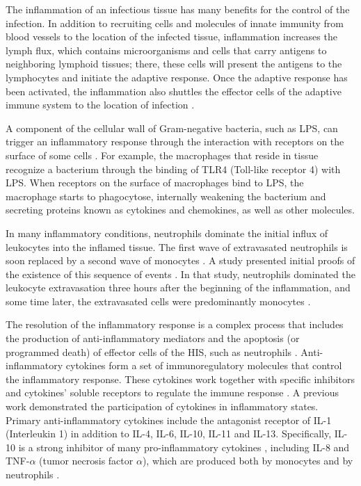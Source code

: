 \documentclass[10pt]{bmc_article}
\newenvironment{bmcformat}{\baselineskip20pt\sloppy\setboolean{publ}{false}}{\baselineskip20pt\sloppy}
\begin{document}
\begin{bmcformat}
The inflammation of an infectious tissue has many benefits for the control of the infection. In addition to recruiting cells and 
molecules of innate immunity from blood vessels to the location of the infected tissue, inflammation increases the lymph flux, 
which contains microorganisms and cells that carry antigens to neighboring lymphoid tissues; there, these cells will present the 
antigens to the lymphocytes and initiate the adaptive response. Once the adaptive response has been activated, the inflammation 
also shuttles the effector cells of the adaptive immune system to the location of infection \cite{janeway}.

A component of the cellular wall of Gram-negative bacteria, such as LPS, can trigger an inflammatory response through the interaction 
with receptors on the surface of some cells \cite{Sompayrac2008}. For example, the macrophages that reside in tissue recognize a bacterium through the 
binding of TLR4 (Toll-like receptor 4) with LPS. When receptors on the surface of macrophages bind to LPS, the macrophage starts 
to phagocytose, internally weakening the bacterium and secreting proteins known as cytokines and chemokines, as well as other molecules. 

In many inflammatory conditions, neutrophils dominate the initial influx of leukocytes into the inflamed tissue. The first wave of 
extravasated neutrophils is soon replaced by a second wave of monocytes \cite{Sompayrac2008}. A study presented initial proofs of the existence of this 
sequence of events \cite{Rebuck1955}. In that study, neutrophils dominated the leukocyte extravasation three hours after the beginning 
of the inflammation, and some time later, the extravasated cells were predominantly monocytes \cite{Rebuck1955}. 

The resolution of the inflammatory response is a complex process that includes the production of anti-inflammatory mediators and the 
apoptosis (or programmed death) of effector cells of the HIS, such as neutrophils \cite{Opal2000}. Anti-inflammatory cytokines form a set of 
immunoregulatory molecules that control the inflammatory response. These cytokines work together with specific inhibitors and cytokines' 
soluble receptors to regulate the immune response \cite{Opal2000}. A previous work \cite{Opal2000} demonstrated the participation of cytokines in 
inflammatory states. Primary anti-inflammatory cytokines include the antagonist receptor of IL-1 (Interleukin 1) in addition to IL-4, 
IL-6, IL-10, IL-11 and IL-13\cite{Opal2000}. Specifically, IL-10 is a strong inhibitor of many pro-inflammatory cytokines \cite{Fiorentino1991}, 
including IL-8 and TNF-$\alpha$ (tumor necrosis factor $\alpha$), which are produced both by monocytes \cite{Waal1991} and by 
neutrophils \cite{Cassatella1993,Marie1996}.


\end{bmcformat}
\end{document}
